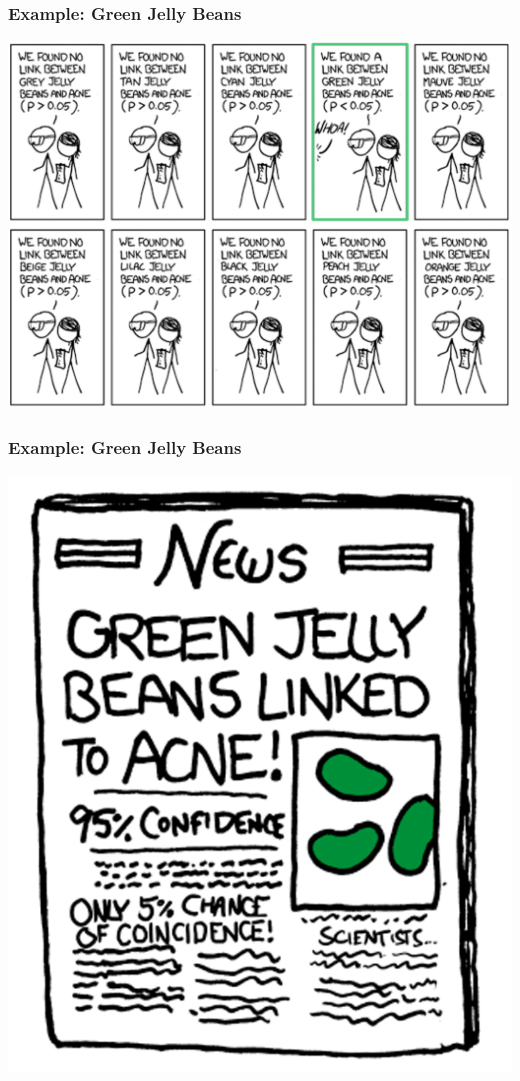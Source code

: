 \documentclass[10pt, block=fill]{beamer}
\begin{document}
\begin{frame}
  \frametitle{Example: Green Jelly Beans}

  \begin{center}
  \includegraphics[width=0.9\linewidth]{figures/jelly_beans_3.png}  
  \end{center}

\end{frame}


\begin{frame}
  \frametitle{Example: Green Jelly Beans}

  \begin{center}
  \includegraphics[width=0.6\linewidth]{figures/jelly_beans_4.png}  
  \end{center}

\end{frame}
\end{document}
